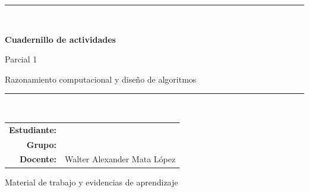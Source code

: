 \documentclass[11pt,letterpaper]{article}
\newcommand{\Asignatura}{Razonamiento computacional y diseño de algoritmos}
\newcommand{\NumeroParcial}{1}
\newcommand{\Docente}{Walter Alexander Mata López}
\newcommand{\Estudiante}{}
\newcommand{\Grupo}{}
\newcounter{actividad}
\begin{document}
\setcounter{secnumdepth}{0}

\hypersetup{pageanchor=false}
\begin{titlepage}
  \thispagestyle{empty}
  \centering
  \vspace*{2.2cm}
  {\color{AzulParcial}\rule{\textwidth}{1.5pt}}\\[1.1cm]
  {\Huge\bfseries Cuadernillo de actividades\par}
  \vspace{3mm}
  {\LARGE Parcial \NumeroParcial\par}
  \vspace{8mm}
  {\Large \Asignatura\par}
  \vspace{1.1cm}
  {\color{AzulParcial}\rule{\textwidth}{1.5pt}}\\[1.4cm]

  \begin{tabular}{@{}rl@{}}
    \textbf{Estudiante:} & \Estudiante \\[3mm]
    \textbf{Grupo:}      & \Grupo \\[3mm]
    \textbf{Docente:}    & \Docente
  \end{tabular}

  \vfill
  {\large Material de trabajo y evidencias de aprendizaje\par}
\end{titlepage}

\hypersetup{pageanchor=true}
\tableofcontents
\newpage
{}


\end{document}
